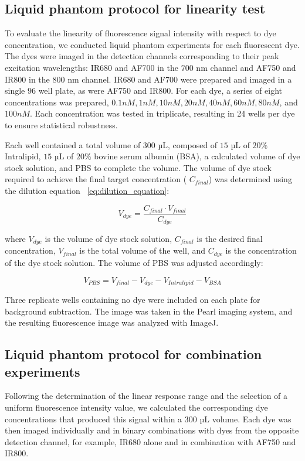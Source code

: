 \subsection{Liquid phantom protocol for linearity test}

To evaluate the linearity of fluorescence signal intensity with respect to dye concentration, we conducted liquid phantom experiments for each fluorescent dye. The dyes were imaged in the detection channels corresponding to their peak excitation wavelengths: IR680 and AF700 in the $700$ nm channel and AF750 and IR800 in the $800$ nm channel. IR680 and AF700 were prepared and imaged in a single $96$ well plate, as were AF750 and IR800. For each dye, a series of eight concentrations was prepared, $0.1 nM, 1 nM, 10 nM,  20 nM, 40 nM,60 nM, 80 nM$, and $100 nM$. Each concentration was tested in triplicate, resulting in 24 wells per dye to ensure statistical robustness.

Each well contained a total volume of $300$ µL, composed of $15$ µL of $20\%$ Intralipid, $15$ µL of $20\%$ bovine serum albumin (BSA), a calculated volume of dye stock solution, and PBS to complete the volume. The volume of dye stock required to achieve the final target concentration ( $C_{final}$) was determined using the dilution equation ~\ref{eq:dilution_equation}:

\begin{equation}
    \label{eq:dilution_equation}
    V_{dye} = \frac{C_{final} \cdot V_{final}}{C_{dye}}
\end{equation}

where $V_{dye}$ is the volume of dye stock solution, $C_{final}$ is the desired final concentration, $V_{final}$ is the total
volume of the well, and $C_{dye}$ is the concentration of the dye stock solution. The volume of PBS was adjusted accordingly:

\begin{equation}
    \label{eq:pbs_volume}
    V_{PBS} = V_{final} - V_{dye} - V_{Intralipid} - V_{BSA}
\end{equation}

Three replicate wells containing no dye were included on each plate for background subtraction. The image was taken in the Pearl imaging system, and the resulting fluorescence image was analyzed with ImageJ.

\subsection{Liquid phantom protocol for combination experiments}
Following the determination of the linear response range and the selection of a uniform fluorescence intensity value, we calculated the corresponding dye concentrations that produced this signal within a $300$ µL volume. Each dye was then imaged individually and in binary combinations with dyes from the opposite detection channel, for example, IR680 alone and in combination with AF750 and IR800.

